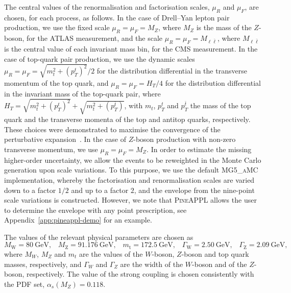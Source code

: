 The central values of the renormalisation and factorisation scales, $\mu_R$ and
$\mu_F$, are chosen, for each process, as follows. In the case of Drell--Yan
lepton pair production, we use the fixed scale $\mu_R=\mu_F=M_Z$, where $M_Z$ is
the mass of the $Z$-boson, for the ATLAS measurement, and the scale
$\mu_R=\mu_F=M_{\ell\bar\ell}$, where $M_{\ell\bar\ell}$ is the central value of each
invariant mass bin, for the CMS measurement.
In the case of top-quark pair production, we use the dynamic scales
$\mu_R=\mu_F=\sqrt{m_t^2+(p_T^t)^2}{\Big /}2$ for the distribution differential
in the transverse momentum of the top quark, and $\mu_R=\mu_F=H_T/4$ for the
distribution differential in the invariant mass of the top-quark pair, where
$H_T=\sqrt{m_t^2+(p_T^t)^2}+\sqrt{m_t^2+(p_T^{\bar{t}})}$, with $m_t$,
$p_T^t$ and $p_T^{\bar t}$ the mass of the top quark and the transverse momenta
of the top and antitop quarks, respectively. These choices were demonstrated
to maximise the convergence of the perturbative expansion~\cite{Czakon:2016dgf}.
In the case of $Z$-boson production with non-zero transverse momentum, we use
$\mu_R=\mu_F=M_Z$. In order to estimate the missing higher-order uncertainty,
we allow the events to be reweighted in the Monte Carlo generation upon scale
variations. To this purpose, we use the default \textsc{MG5\_aMC}
implementation, whereby the factorisation and renormalisation scales
are varied down to a factor $1/2$ and up to a factor $2$, and the envelope
from the nine-point scale variations is constructed. However, we note that
\textsc{PineAPPL} allows the user to determine the envelope with any point
prescription, see Appendix~\ref{app:pineappl-demo} for an example.

The values of the relevant physical parameters are chosen as
\begin{equation}
M_\mathrm{W} = \SI{80}{\giga\electronvolt} \text{,} \quad 
M_\mathrm{Z} = \SI{91.176}{\giga\electronvolt} \text{,} \quad 
m_\mathrm{t} = \SI{172.5}{\giga\electronvolt} \text{,} \quad
\Gamma_\mathrm{W} = \SI{2.50}{\giga\electronvolt} \text{,} \quad
\Gamma_\mathrm{Z} = \SI{2.09}{\giga\electronvolt} \text{,} 
\label{eq:parameters}
\end{equation}
where $M_W$, $M_Z$ and $m_t$ are the values of the $W$-boson, $Z$-boson and
top quark masses, respectively, and $\Gamma_W$ and $\Gamma_Z$ are the width of
the $W$-boson and of the $Z$-boson, respectively. The value of the strong
coupling is chosen consistently with the PDF set, $\alpha_s(M_Z)=0.118$.


